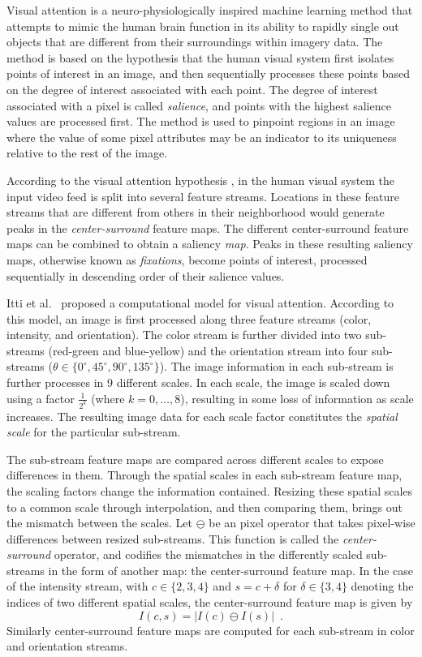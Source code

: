 Visual attention is a neuro-physiologically inspired machine learning method \cite{koch}
that attempts to mimic the human brain function in its ability to rapidly single out
objects that are different from their surroundings within imagery data.
The method is based on the hypothesis that the human visual system first isolates 
points of interest in an image, and then sequentially processes these points 
based on the degree of interest associated with each point.
The degree of interest associated with a pixel is called \emph{salience},
and points with the highest salience values are processed first.
The method is used to pinpoint 
regions in an image where the value of some pixel attributes may be an indicator to
its uniqueness relative to the rest of the image.  

According to the visual attention hypothesis \cite{koch}, in the 
human visual system the input video feed 
is split into several feature streams.
Locations in these feature streams that are different from others in their neighborhood would generate 
peaks in the \emph{center-surround} feature maps.
The different center-surround feature maps can be combined to obtain a 
saliency \emph{map}.
Peaks in these resulting saliency maps, otherwise known as \emph{fixations}, become 
points of interest, processed sequentially in descending order of their salience values.

Itti et al.~\cite{itti} proposed a computational model for visual attention.
According to this model, an image is first processed along three feature streams 
(color, intensity, and orientation).  
The color stream is further divided into two sub-streams (red-green and blue-yellow) and 
the orientation stream into four sub-streams 
($\theta \in \{0^\circ, 45^\circ, 90^\circ, 135^\circ\}$).
The image information in each sub-stream is further processes in 9 different scales.
In each scale, the image is scaled down using a factor $\frac{1}{2^k}$ (where $k = 0,\ldots,8$),
resulting in some loss of information as scale increases.
The resulting image data for each scale factor constitutes the
\emph{spatial scale} for the particular sub-stream.

The sub-stream feature maps are compared across different scales to expose
differences in them. Through the spatial scales in each sub-stream feature map, the scaling factors change the information
contained. Resizing these spatial scales to a common scale through interpolation, and then comparing them, brings out 
the mismatch between the scales.
Let $\ominus$ be an pixel operator that takes pixel-wise differences between resized sub-streams.  This function is called the \emph{center-surround} operator, and codifies the mismatches in the differently scaled sub-streams in the form of another map: the center-surround feature map.  In the case of
the intensity stream, with $c\in\{2,3,4\}$ and $s=c+\delta$ for $\delta \in \{3,4\}$ denoting the indices of two different spatial scales, the center-surround feature map is given by
%
\begin{equation} \label{intensity-CS}
 I(c,s)=\left|I(c)\ominus I(s)\right| \enspace.
\end{equation}
%
Similarly center-surround feature maps are computed for each sub-stream 
in color and orientation streams. 

